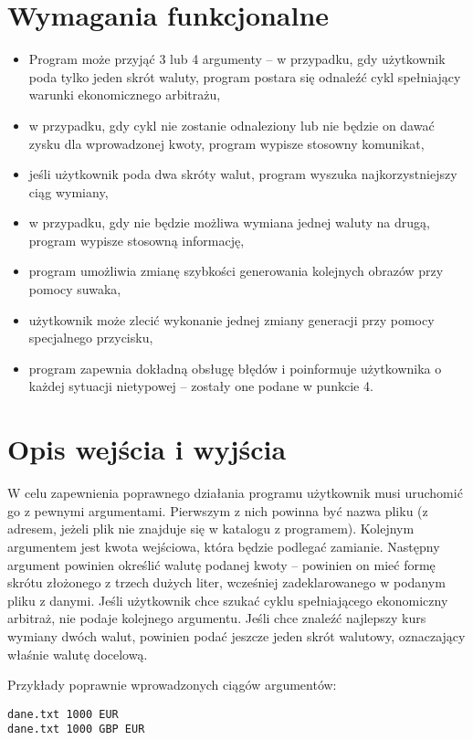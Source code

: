 \documentclass[a4paper,11pt]{article}
\newcommand\tab[1][0.6cm]{\hspace*{#1}}
\begin{document}
\section{Wymagania funkcjonalne}
\begin{itemize}

\item Program może przyjąć 3 lub 4 argumenty -- w przypadku, gdy użytkownik poda tylko jeden skrót waluty, program postara się odnaleźć cykl spełniający warunki ekonomicznego arbitrażu,
\item w przypadku, gdy cykl nie zostanie odnaleziony lub nie będzie on dawać zysku dla wprowadzonej kwoty, program wypisze stosowny komunikat,
\item jeśli użytkownik poda dwa skróty walut, program wyszuka najkorzystniejszy ciąg wymiany,
\item w przypadku, gdy nie będzie możliwa wymiana jednej waluty na drugą, program wypisze stosowną informację,
\item program umożliwia zmianę szybkości generowania kolejnych obrazów przy pomocy suwaka,
\item użytkownik może zlecić wykonanie jednej zmiany generacji przy pomocy specjalnego przycisku,
\item program zapewnia dokładną obsługę błędów i poinformuje użytkownika o każdej sytuacji nietypowej -- zostały one podane w punkcie 4. 
\end{itemize}

\section{Opis wejścia i wyjścia}

\tab W celu zapewnienia poprawnego działania programu użytkownik musi uruchomić go z pewnymi argumentami. Pierwszym z nich powinna być nazwa pliku (z adresem, jeżeli plik nie znajduje się w katalogu z programem). Kolejnym argumentem jest kwota wejściowa, która będzie podlegać zamianie. Następny argument powinien określić walutę podanej kwoty -- powinien on mieć formę skrótu złożonego z trzech dużych liter, wcześniej zadeklarowanego w podanym pliku z danymi. Jeśli użytkownik chce szukać cyklu spełniającego ekonomiczny arbitraż, nie podaje kolejnego argumentu. Jeśli chce znaleźć najlepszy kurs wymiany dwóch walut, powinien podać jeszcze jeden skrót walutowy, oznaczający właśnie walutę docelową.

Przykłady poprawnie wprowadzonych ciągów argumentów:

\begin{lstlisting}
dane.txt 1000 EUR
dane.txt 1000 GBP EUR 
\end{lstlisting}
\end{document}
